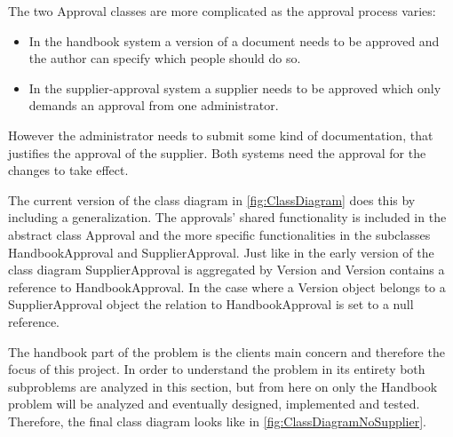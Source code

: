 The two Approval classes are more complicated as the approval process varies:

\begin{itemize}
  \item In the handbook system a version of a document needs to be approved and the author can specify which people should do so.
  \item In the supplier-approval system a supplier needs to be approved which only demands an approval from one administrator.
\end{itemize}

However the administrator needs to submit some kind of documentation, that justifies the approval of the supplier.
Both systems need the approval for the changes to take effect.

The current version of the class diagram in \cref{fig:ClassDiagram} does this by including a generalization. The approvals' shared functionality is included in the abstract class Approval and the more specific functionalities in the subclasses HandbookApproval and SupplierApproval.
Just like in the early version of the class diagram SupplierApproval is aggregated by Version and Version contains a reference to HandbookApproval.
In the case where a Version object belongs to a SupplierApproval object the relation to HandbookApproval is set to a null reference.

The handbook part of the problem is the clients main concern and therefore the focus of this project.
In order to understand the problem in its entirety both subproblems are analyzed in this section, but from here on  only the Handbook problem will be analyzed and eventually designed, implemented and tested.
Therefore, the final class diagram looks like in \cref{fig:ClassDiagramNoSupplier}.

